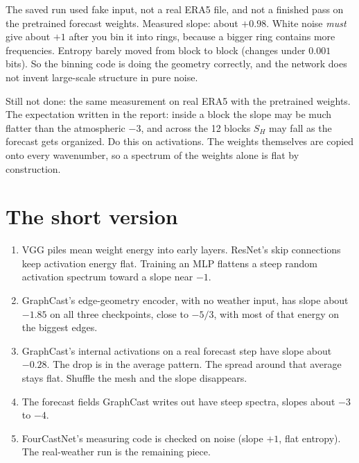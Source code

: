 \documentclass[11pt,a4paper]{article}
\begin{document}
The saved run used fake input, not a real ERA5 file, and not a finished pass on the pretrained forecast weights.
Measured slope: about \(+0.98\).
White noise \emph{must} give about \(+1\) after you bin it into rings, because a bigger ring contains more frequencies.
Entropy barely moved from block to block (changes under \(0.001\) bits).
So the binning code is doing the geometry correctly, and the network does not invent large-scale structure in pure noise.

Still not done: the same measurement on real ERA5 with the pretrained weights.
The expectation written in the report: inside a block the slope may be much flatter than the atmospheric \(-3\), and across the 12 blocks \(S_H\) may fall as the forecast gets organized.
Do this on activations. The weights themselves are copied onto every wavenumber, so a spectrum of the weights alone is flat by construction.

\section*{The short version}

\begin{enumerate}
  \item VGG piles mean weight energy into early layers. ResNet's skip connections keep activation energy flat. Training an MLP flattens a steep random activation spectrum toward a slope near \(-1\).
  \item GraphCast's edge-geometry encoder, with no weather input, has slope about \(-1.85\) on all three checkpoints, close to \(-5/3\), with most of that energy on the biggest edges.
  \item GraphCast's internal activations on a real forecast step have slope about \(-0.28\). The drop is in the average pattern. The spread around that average stays flat. Shuffle the mesh and the slope disappears.
  \item The forecast fields GraphCast writes out have steep spectra, slopes about \(-3\) to \(-4\).
  \item FourCastNet's measuring code is checked on noise (slope \(+1\), flat entropy). The real-weather run is the remaining piece.
\end{enumerate}
\end{document}
